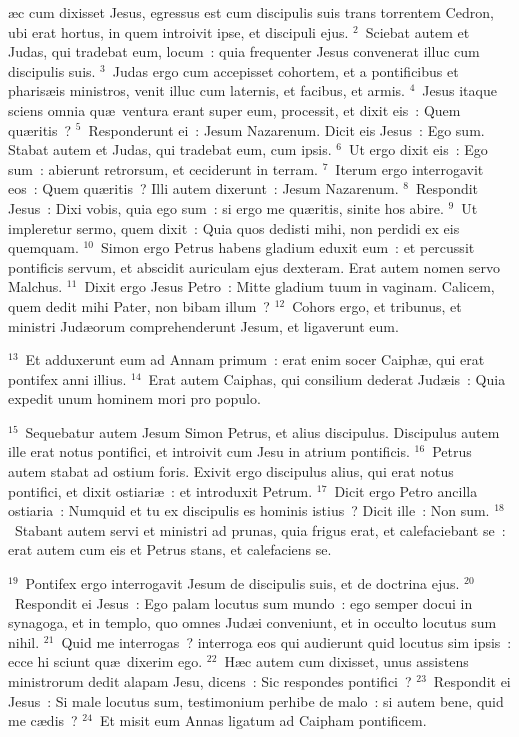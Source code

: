 \bchapter
{}\ae c cum dixisset Jesus, egressus est cum discipulis suis trans torrentem Cedron, ubi erat hortus, in quem introivit ipse, et discipuli ejus.
${}^{2}$~Sciebat autem et Judas, qui tradebat eum, locum~: quia frequenter Jesus convenerat illuc cum discipulis suis.
${}^{3}$~Judas ergo cum accepisset cohortem, et a pontificibus et pharis\ae is ministros, venit illuc cum laternis, et facibus, et armis.
${}^{4}$~Jesus itaque sciens omnia qu\ae\ ventura erant super eum, processit, et dixit eis~: Quem qu\ae ritis~?
${}^{5}$~Responderunt ei~: Jesum Nazarenum. Dicit eis Jesus~: Ego sum. Stabat autem et Judas, qui tradebat eum, cum ipsis.
${}^{6}$~Ut ergo dixit eis~: Ego sum~: abierunt retrorsum, et ceciderunt in terram.
${}^{7}$~Iterum ergo interrogavit eos~: Quem qu\ae ritis~? Illi autem dixerunt~: Jesum Nazarenum.
${}^{8}$~Respondit Jesus~: Dixi vobis, quia ego sum~: si ergo me qu\ae ritis, sinite hos abire.
${}^{9}$~Ut impleretur sermo, quem dixit~: Quia quos dedisti mihi, non perdidi ex eis quemquam.
${}^{10}$~Simon ergo Petrus habens gladium eduxit eum~: et percussit pontificis servum, et abscidit auriculam ejus dexteram. Erat autem nomen servo Malchus.
${}^{11}$~Dixit ergo Jesus Petro~: Mitte gladium tuum in vaginam. Calicem, quem dedit mihi Pater, non bibam illum~?
${}^{12}$~Cohors ergo, et tribunus, et ministri Jud\ae orum comprehenderunt Jesum, et ligaverunt eum.


${}^{13}$~Et adduxerunt eum ad Annam primum~: erat enim socer Caiph\ae , qui erat pontifex anni illius.
${}^{14}$~Erat autem Caiphas, qui consilium dederat Jud\ae is~: Quia expedit unum hominem mori pro populo.


${}^{15}$~Sequebatur autem Jesum Simon Petrus, et alius discipulus. Discipulus autem ille erat notus pontifici, et introivit cum Jesu in atrium pontificis.
${}^{16}$~Petrus autem stabat ad ostium foris. Exivit ergo discipulus alius, qui erat notus pontifici, et dixit ostiari\ae~: et introduxit Petrum.
${}^{17}$~Dicit ergo Petro ancilla ostiaria~: Numquid et tu ex discipulis es hominis istius~? Dicit ille~: Non sum.
${}^{18}$~Stabant autem servi et ministri ad prunas, quia frigus erat, et calefaciebant se~: erat autem cum eis et Petrus stans, et calefaciens se.


${}^{19}$~Pontifex ergo interrogavit Jesum de discipulis suis, et de doctrina ejus.
${}^{20}$~Respondit ei Jesus~: Ego palam locutus sum mundo~: ego semper docui in synagoga, et in templo, quo omnes Jud\ae i conveniunt, et in occulto locutus sum nihil.
${}^{21}$~Quid me interrogas~? interroga eos qui audierunt quid locutus sim ipsis~: ecce hi sciunt qu\ae\ dixerim ego.
${}^{22}$~H\ae c autem cum dixisset, unus assistens ministrorum dedit alapam Jesu, dicens~: Sic respondes pontifici~?
${}^{23}$~Respondit ei Jesus~: Si male locutus sum, testimonium perhibe de malo~: si autem bene, quid me c\ae dis~?
${}^{24}$~Et misit eum Annas ligatum ad Caipham pontificem.



